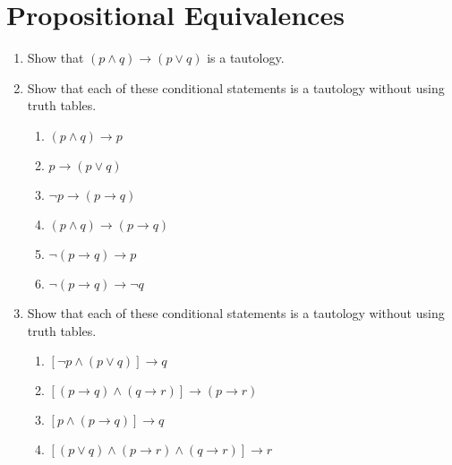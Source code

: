 \documentclass{sig-alternate-05-2015}
\begin{document}
\section{Propositional Equivalences}
\begin{enumerate}
\item Show that $(p \wedge q) \rightarrow (p \vee q)$ is a tautology.

\item Show that each of these conditional statements is a tautology without using truth tables.
\begin{enumerate}
	\item $(p \wedge q) \rightarrow p$
	\item $p \rightarrow (p \vee q)$
	\item $\neg p \rightarrow (p \rightarrow q)$
	\item $(p \wedge q) \rightarrow (p \rightarrow q)$
	\item $\neg (p \rightarrow q) \rightarrow p$
	\item $\neg(p \rightarrow q) \rightarrow \neg q$
\end{enumerate}

\item Show that each of these conditional statements is a tautology without using truth tables.
\begin{enumerate}
	\item $[\neg p \wedge (p \vee q)] \rightarrow q$
	\item $[(p \rightarrow q) \wedge (q \rightarrow r)] \rightarrow (p \rightarrow r)$
	\item $[p \wedge (p \rightarrow q)] \rightarrow q$
	\item $[(p \vee q ) \wedge (p \rightarrow r) \wedge (q \rightarrow r)] \rightarrow r$
\end{enumerate}

\end{enumerate}
\end{document}
